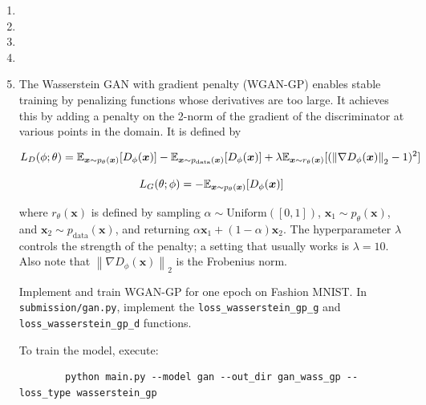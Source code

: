 \begin{enumerate}[label=(\alph*)]
    \item 

    \item 

    \item 

    \item 

    \item {} The Wasserstein GAN with gradient penalty (WGAN-GP) enables stable training by penalizing functions whose 
    derivatives are too large. It achieves this by adding a penalty on the 2-norm of the gradient of the discriminator 
    at various points in the domain. It is defined by

    \begin{equation} \label{eq:24}
        L_D(\phi; \theta) = \mathbb{E}_{\bm{x} \sim p_{\theta}(\bm{x})}[D_{\phi}(\bm{x})] - \mathbb{E}_{\bm{x} \sim p_{\text{data}}(\bm{x})}[D_{\phi}(\bm{x})] + \lambda \mathbb{E}_{\bm{x} \sim r_{\theta}(\bm{x})}[({\left\| \nabla D_{\phi}(\bm{x})\right\|}_{2}-1)^2]
    \end{equation}

    \begin{equation} \label{eq:25}
        L_G(\theta; \phi) = - \mathbb{E}_{\bm{x} \sim p_{\theta}(\bm{x})} [D_{\phi}(\bm{x})]
    \end{equation}

    where $r_{\theta}(\bm{x})$ is defined by sampling $\alpha \sim \text{Uniform}([0,1])$, $\bm{x}_1 \sim p_{\theta}(\bm{x})$, and
    $\bm{x}_2 \sim p_{\text{data}}(\bm{x})$, and returning $\alpha \bm{x}_1 + (1-\alpha)\bm{x}_2$. The hyperparameter $\lambda$ 
    controls the strength of the penalty; a setting that usually works is $\lambda = 10$. Also note that ${\left\| \nabla D_{\phi}(\bm{x})\right\|}_{2}$
    is the Frobenius norm.

    Implement and train WGAN-GP for one epoch on Fashion MNIST. In \texttt{submission/gan.py}, implement the 
    \texttt{loss\_wasserstein\_gp\_g} and \texttt{loss\_wasserstein\_gp\_d} functions. 
    
    To train the model, execute:
    \begin{verbatim}
        python main.py --model gan --out_dir gan_wass_gp --loss_type wasserstein_gp
    \end{verbatim} 


\end{enumerate}
